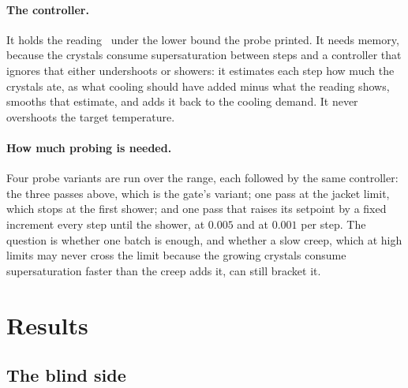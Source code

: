 \documentclass[11pt,a4paper]{article}
\begin{document}
\paragraph{The controller.} It holds the reading \SZmargin\ under the lower
bound the probe printed. It needs memory, because the crystals consume
supersaturation between steps and a controller that ignores that either
undershoots or showers: it estimates each step how much the crystals ate, as
what cooling should have added minus what the reading shows, smooths that
estimate, and adds it back to the cooling demand. It never overshoots the
target temperature.
\begin{scriptsize}

\end{scriptsize}

\paragraph{How much probing is needed.} Four probe variants are run over the
range, each followed by the same controller: the three passes above, which
is the gate's variant; one pass at the jacket limit, which stops at the
first shower; and one pass that raises its setpoint by a fixed increment
every step until the shower, at $0.005$ and at $0.001$ per step. The
question is whether one batch is enough, and whether a slow creep, which at
high limits may never cross the limit because the growing crystals consume
supersaturation faster than the creep adds it, can still bracket it.

\section{Results}
\label{sec:results}

\subsection{The blind side}

\begin{table}[h]
\centering\small
\resizebox{\linewidth}{!}{}
\caption{Blind side: one controller per family, tuned across the range,
scored on the \SZnfresh\ fresh batches.}
\label{tab:blind}
\end{table}
\end{document}
